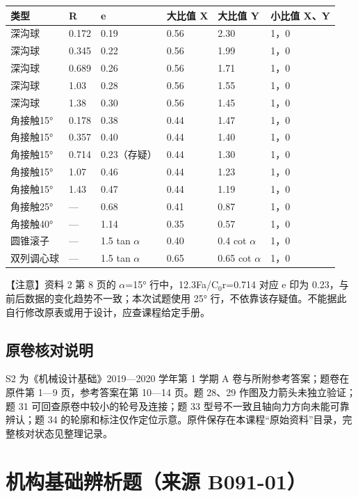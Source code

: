 \documentclass[zihao=5,a4paper,UTF8,fontset=fandol]{ctexart}
\begin{document}
\begin{longtable}{p{2.21cm}p{2.21cm}p{2.21cm}p{2.21cm}p{2.21cm}p{2.21cm}}
\toprule
类型 & R & e & 大比值 X & 大比值 Y & 小比值 X、Y \\

\midrule
\endhead
深沟球 & 0.172 & 0.19 & 0.56 & 2.30 & 1，0 \\
深沟球 & 0.345 & 0.22 & 0.56 & 1.99 & 1，0 \\
深沟球 & 0.689 & 0.26 & 0.56 & 1.71 & 1，0 \\
深沟球 & 1.03 & 0.28 & 0.56 & 1.55 & 1，0 \\
深沟球 & 1.38 & 0.30 & 0.56 & 1.45 & 1，0 \\
角接触15° & 0.178 & 0.38 & 0.44 & 1.47 & 1，0 \\
角接触15° & 0.357 & 0.40 & 0.44 & 1.40 & 1，0 \\
角接触15° & 0.714 & 0.23（存疑） & 0.44 & 1.30 & 1，0 \\
角接触15° & 1.07 & 0.46 & 0.44 & 1.23 & 1，0 \\
角接触15° & 1.43 & 0.47 & 0.44 & 1.19 & 1，0 \\
角接触25° & — & 0.68 & 0.41 & 0.87 & 1，0 \\
角接触40° & — & 1.14 & 0.35 & 0.57 & 1，0 \\
圆锥滚子 & — & 1.5 tan $\alpha$ & 0.40 & 0.4 cot $\alpha$ & 1，0 \\
双列调心球 & — & 1.5 tan $\alpha$ & 0.65 & 0.65 cot $\alpha$ & 1，0 \\
\bottomrule
\end{longtable}

【注意】资料 2 第 8 页的 $\alpha$=15° 行中，12.3Fa/C$_{0}$r=0.714 对应 e 印为 0.23，与前后数据的变化趋势不一致；本次试题使用 25° 行，不依靠该存疑值。不能据此自行修改原表或用于设计，应查课程给定手册。


\subsection{原卷核对说明}

S2 为《机械设计基础》2019—2020 学年第 1 学期 A 卷与所附参考答案；题卷在原件第 1—9 页，参考答案在第 10—14 页。题 28、29 作图及力箭头未独立验证；题 31 可回查原卷中较小的轮号及连接；题 33 型号不一致且轴向力方向未能可靠辨认；题 34 的轮廓和标注仅作定位示意。原件保存在本课程“原始资料”目录，完整核对状态见整理记录。


\section{机构基础辨析题（来源 B091-01）}
\end{document}
